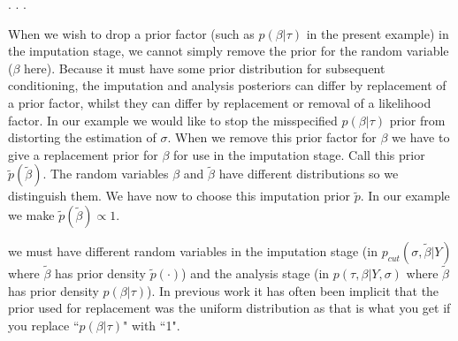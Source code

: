 .
.
.

When we wish to drop a prior factor (such as $p(\beta|\tau)$ in the present example) in the imputation stage, we cannot simply remove the prior for the random variable ($\beta$ here). Because it must have some prior distribution for subsequent conditioning, the imputation and analysis posteriors can differ by replacement of a prior factor, whilst they can differ by replacement or removal of a likelihood factor.
In our example we would like to stop the misspecified $p(\beta |\tau)$ prior from distorting the estimation of $\sigma$.
When we remove this prior factor for $\beta$ we have to give a replacement prior for $\beta$ for use in the imputation stage. Call this prior $\tilde p(\tilde\beta)$. The random variables $\beta$ and $\tilde\beta$ have different distributions so we distinguish them. We have now to choose this imputation prior $\tilde p$. In our example we make $\tilde p(\tilde\beta)\propto 1$.

we must have different random variables in the imputation stage (in $p_{cut}(\sigma,\tilde\beta|Y)$ where $\tilde\beta$ has prior density $\tilde p(\cdot)$) and the analysis stage (in $p(\tau,\beta|Y,\sigma)$ where $\tilde\beta$ has prior density $p(\beta|\tau)$). In previous work it has often been implicit that the prior used for replacement was the uniform distribution as that is what you get if you replace ``$p(\beta|\tau)$" with ``1".


